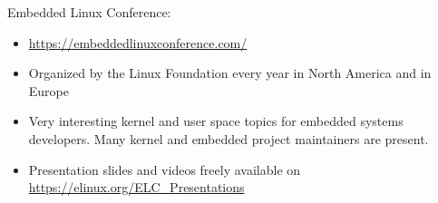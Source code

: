 \item Embedded Linux Conference:
  \begin{itemize}
  \item \url{https://embeddedlinuxconference.com/}
  \item Organized by the Linux Foundation every year in North America and in Europe
  \item Very interesting kernel and user space topics for embedded
        systems developers. Many kernel and embedded project maintainers are present.
  \item Presentation slides and videos freely available on
    \url{https://elinux.org/ELC_Presentations} 
  \end{itemize}
